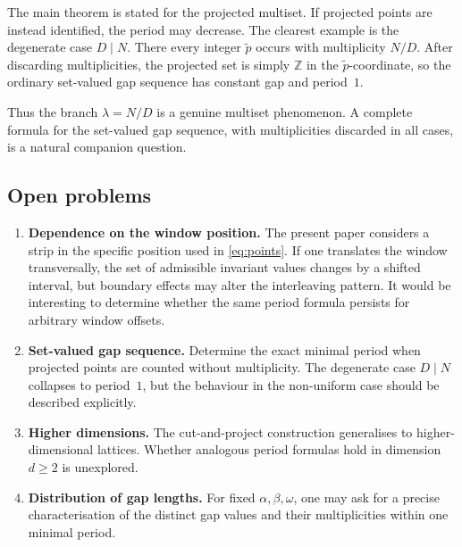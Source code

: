\documentclass[11pt]{article}
\theoremstyle{plain}
\theoremstyle{definition}
\theoremstyle{remark}
\begin{document}
The main theorem is stated for the projected multiset.  If projected points
are instead identified, the period may decrease.  The clearest example is
the degenerate case \(D \mid N\).  There every integer \(\tilde p\) occurs
with multiplicity \(N/D\).  After discarding multiplicities, the projected
set is simply \(\mathbb{Z}\) in the \(\tilde p\)-coordinate, so the ordinary
set-valued gap sequence has constant gap and period~\(1\).

Thus the branch \(\lambda=N/D\) is a genuine multiset phenomenon.  A complete
formula for the set-valued gap sequence, with multiplicities discarded in
all cases, is a natural companion question.

\subsection{Open problems}

\begin{enumerate}
    \item \textbf{Dependence on the window position.}
    The present paper considers a strip in the specific position used in
    \eqref{eq:points}.  If one translates the window transversally, the set of
    admissible invariant values changes by a shifted interval, but boundary
    effects may alter the interleaving pattern.  It would be interesting to
    determine whether the same period formula persists for arbitrary window
    offsets.

    \item \textbf{Set-valued gap sequence.}
    Determine the exact minimal period when projected points are counted
    without multiplicity.  The degenerate case \(D \mid N\) collapses to
    period~\(1\), but the behaviour in the non-uniform case should be
    described explicitly.

    \item \textbf{Higher dimensions.}
    The cut-and-project construction generalises to higher-dimensional
    lattices.  Whether analogous period formulas hold in dimension
    \(d \ge 2\) is unexplored.

    \item \textbf{Distribution of gap lengths.}
    For fixed \(\alpha, \beta, \omega\), one may ask for a precise
    characterisation of the distinct gap values and their multiplicities
    within one minimal period.
\end{enumerate}

\end{document}
